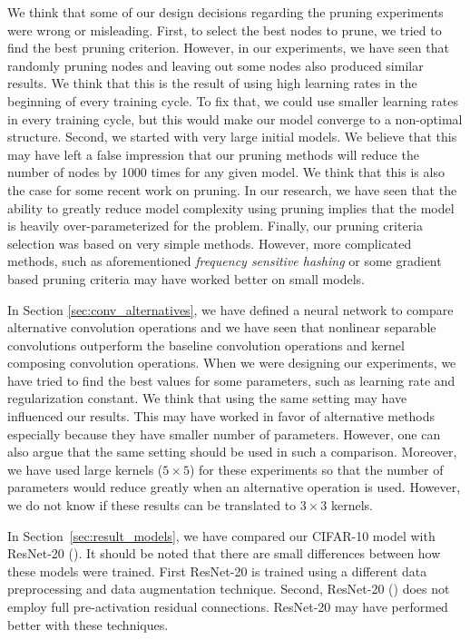 We think that some of our design decisions regarding the pruning experiments were wrong or misleading. First, to select the best nodes to prune, we tried to find the best pruning criterion. However, in our experiments, we have seen that randomly pruning nodes and leaving out some nodes also produced similar results. We think that this is the result of using high learning rates in the beginning of every training cycle. To fix that, we could use smaller learning rates in every training cycle, but this would make our model converge to a non-optimal structure. Second, we started with very large initial models. We believe that this may have left a false impression that our pruning methods will reduce the number of nodes by 1000 times for any given model. We think that this is also the case for some recent work on pruning. In our research, we have seen that the ability to greatly reduce model complexity using pruning implies that the model is heavily over-parameterized for the problem. Finally, our pruning criteria selection was based on very simple methods. However, more complicated methods, such as aforementioned \textit{frequency sensitive hashing} or some gradient based pruning criteria may have worked better on small models.

In Section \ref{sec:conv_alternatives}, we have defined a neural network to compare alternative convolution operations and we have seen that nonlinear separable convolutions outperform the baseline convolution operations and kernel composing convolution operations. When we were designing our experiments, we have tried to find the best values for some parameters, such as learning rate and regularization constant. We think that using the same setting may have influenced our results. This may have worked in favor of alternative methods especially because they have smaller number of parameters. However, one can also argue that the same setting should be used in such a comparison. Moreover, we have used large kernels ($5 \times 5$) for these experiments so that the number of parameters would reduce greatly when an alternative operation is used. However, we do not know if these results can be translated to $3 \times 3$ kernels.

In Section~\ref{sec:result_models}, we have compared our CIFAR-10 model with ResNet-20 (\cite{He:2015aa}). It should be noted that there are small differences between how these models were trained. First ResNet-20 is trained using a different data preprocessing and data augmentation technique. Second, ResNet-20 (\cite{He:2015aa}) does not employ full pre-activation residual connections. ResNet-20 may have performed better with these techniques.

